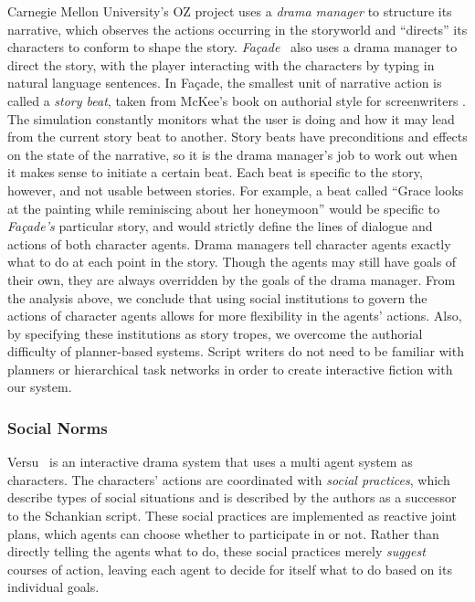 Carnegie Mellon University's OZ project \cite{mateas1999oz} uses a \emph{drama manager} to structure its narrative, which observes the actions occurring in the storyworld and ``directs'' its characters to conform to shape the story. \emph{Fa\c{c}ade}~\cite{mateas2003faccade} also uses a drama manager to direct the story, with the player interacting with the characters by typing in natural language sentences. In Fa\c{c}ade, the smallest unit of narrative action is called a \emph{story beat}, taken from McKee's book on authorial style for screenwriters \cite{mckee1997substance}. The simulation constantly monitors what the user is doing and how it may lead from the current story beat to another. Story beats have preconditions and effects on the state of the narrative, so it is the drama manager's job to work out when it makes sense to initiate a certain beat. Each beat is specific to the story, however, and not usable between stories. For example, a beat called ``Grace looks at the painting while reminiscing about her honeymoon'' would be specific to \emph{Fa\c{c}ade's} particular story, and would strictly define the lines of dialogue and actions of both character agents. Drama managers tell character agents exactly what to do at each point in the story. Though the agents may still have goals of their own, they are always overridden by the goals of the drama manager.
From the analysis above, we conclude that using social institutions to govern the actions of character agents allows for more flexibility in the agents' actions. Also, by specifying these institutions as story tropes, we overcome the authorial difficulty of planner-based systems. Script writers do not need to be familiar with planners or hierarchical task networks in order to create interactive fiction with our system.

\subsubsection{Social Norms}
Versu~\cite{evans2014versu} is an interactive drama system that uses a multi agent system as characters. The characters' actions are coordinated with \emph{social practices}, which describe types of social situations and is described by the authors as a successor to the Schankian script. These social practices are implemented as reactive joint plans, which agents can choose whether to participate in or not. Rather than directly telling the agents what to do, these social practices merely \emph{suggest} courses of action, leaving each agent to decide for itself what to do based on its individual goals.

